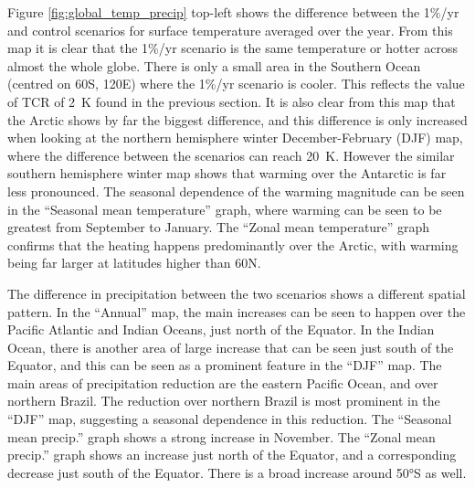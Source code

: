 \documentclass{article}
\begin{document}
Figure \ref{fig:global_temp_precip} top-left shows the difference between the 1\%/yr and control scenarios for surface temperature averaged over the year. From this map it is clear that the 1\%/yr scenario is the same temperature or hotter across almost the whole globe. There is only a small area in the Southern Ocean (centred on 60\textdegree S, 120\textdegree E) where the 1\%/yr scenario is cooler. This reflects the value of TCR of \SI{2}{K} found in the previous section. It is also clear from this map that the Arctic shows by far the biggest difference, and this difference is only increased when looking at the northern hemisphere winter December-February (DJF) map, where the difference between the scenarios can reach \SI{20}{K}. However the similar southern hemisphere winter map shows that warming over the Antarctic is far less pronounced. The seasonal dependence of the warming magnitude can be seen in the ``Seasonal mean temperature'' graph, where warming can be seen to be greatest from September to January. The ``Zonal mean temperature'' graph confirms that the heating happens predominantly over the Arctic, with warming being far larger at latitudes higher than 60\textdegree N.

The difference in precipitation between the two scenarios shows a different spatial pattern. In the ``Annual'' map, the main increases can be seen to happen over the Pacific Atlantic and Indian Oceans, just north of the Equator. In the Indian Ocean, there is another area of large increase that can be seen just south of the Equator, and this can be seen as a prominent feature in the ``DJF'' map. The main areas of precipitation reduction are the eastern Pacific Ocean, and over northern Brazil. The reduction over northern Brazil is most prominent in the ``DJF'' map, suggesting a seasonal dependence in this reduction. The ``Seasonal mean precip.'' graph shows a strong increase in November. The ``Zonal mean precip.'' graph shows an increase just north of the Equator, and a corresponding decrease just south of the Equator. There is a broad increase around 50°S as well.
\end{document}
